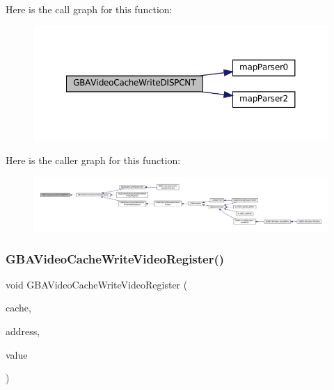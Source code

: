 Here is the call graph for this function\+:
\nopagebreak
\begin{figure}[H]
\begin{center}
\leavevmode
\includegraphics[width=350pt]{gba_2renderers_2cache-set_8c_ac92c0800c27ae258899fe58d4d279f78_cgraph}
\end{center}
\end{figure}
Here is the caller graph for this function\+:
\nopagebreak
\begin{figure}[H]
\begin{center}
\leavevmode
\includegraphics[width=350pt]{gba_2renderers_2cache-set_8c_ac92c0800c27ae258899fe58d4d279f78_icgraph}
\end{center}
\end{figure}
\mbox{\label{gba_2renderers_2cache-set_8c_adb3ad772576f4872cf21d2ad0867830b}} 
\subsubsection{\texorpdfstring{G\+B\+A\+Video\+Cache\+Write\+Video\+Register()}{GBAVideoCacheWriteVideoRegister()}}
{\footnotesize\ttfamily void G\+B\+A\+Video\+Cache\+Write\+Video\+Register (\begin{DoxyParamCaption}\item[{struct m\+Cache\+Set $\ast$}]{cache,  }\item[{uint32\+\_\+t}]{address,  }\item[{uint16\+\_\+t}]{value }\end{DoxyParamCaption})}

